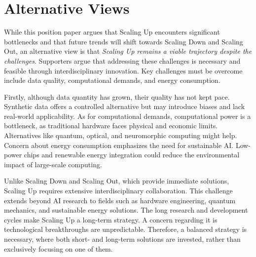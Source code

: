 \section{Alternative Views}

While this position paper argues that Scaling Up encounters significant bottlenecks and that future trends will shift towards Scaling Down and Scaling Out, an alternative view is that \textit{Scaling Up remains a viable trajectory despite the challenges}. Supporters argue that addressing these challenges is necessary and feasible through interdisciplinary innovation. Key challenges must be overcome include data quality, computational demands, and energy consumption.

Firstly, although data quantity has grown, their quality has not kept pace. Synthetic data offers a controlled alternative but may introduce biases and lack real-world applicability.
As for computational demands, computational power is a bottleneck, as traditional hardware faces physical and economic limits. Alternatives like quantum, optical, and neuromorphic computing might help.
Concern about energy consumption emphasizes the need for sustainable AI. Low-power chips and renewable energy integration 
could reduce the environmental impact of large-scale computing.

Unlike Scaling Down and Scaling Out, which provide immediate solutions, Scaling Up requires extensive interdisciplinary collaboration. This challenge extends beyond AI research to fields such as hardware engineering, quantum mechanics, and sustainable energy solutions. The long research and development cycles make Scaling Up a long-term strategy. A concern regarding it is technological breakthroughs are unpredictable. 
Therefore, a balanced strategy is necessary, where both short- and long-term solutions are invested, rather than exclusively focusing on one of them.
